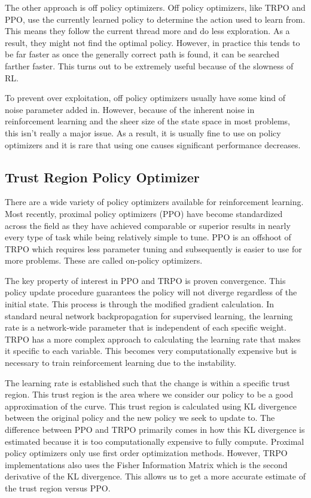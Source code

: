 \documentclass{article}
\begin{document}
The other approach is off policy optimizers. Off policy optimizers, like TRPO and PPO, use the currently learned policy to determine the action used to learn from. This means they follow the current thread more and do less exploration. As a result, they might not find the optimal policy. However, in practice this tends to be far faster as once the generally correct path is found, it can be searched farther faster. This turns out to be extremely useful because of the slowness of RL. 

To prevent over exploitation, off policy optimizers usually have some kind of noise parameter added in. However, because of the inherent noise in reinforcement learning and the sheer size of the state space in most problems, this isn't really a major issue. As a result, it is usually fine to use on policy optimizers and it is rare that using one causes significant performance decreases.

\subsection{Trust Region Policy Optimizer}
There are a wide variety of policy optimizers available for reinforcement learning. Most recently, proximal policy optimizers (PPO) have become standardized across the field as they have achieved comparable or superior results in nearly every type of task while being relatively simple to tune. PPO is an offshoot of TRPO which requires less parameter tuning and subsequently is easier to use for more problems. These are called on-policy optimizers.

The key property of interest in PPO and TRPO is proven convergence. This policy update procedure guarantees the policy will not diverge regardless of the initial state. This process is through the modified gradient calculation. In standard neural network backpropagation for supervised learning, the learning rate is a network-wide parameter that is independent of each specific weight. TRPO has a more complex approach to calculating the learning rate that makes it specific to each variable. This becomes very computationally expensive but is necessary to train reinforcement learning due to the instability.

The learning rate is established such that the change is within a specific trust region. This trust region is the area where we consider our policy to be a good approximation of the curve. This trust region is calculated using KL divergence between the original policy and the new policy we seek to update to. The difference between PPO and TRPO primarily comes in how this KL divergence is estimated because it is too computationally expensive to fully compute. Proximal policy optimizers only use first order optimization methods. However, TRPO implementations also uses the Fisher Information Matrix which is the second derivative of the KL divergence. This allows us to get a more accurate estimate of the trust region versus PPO.
\end{document}
